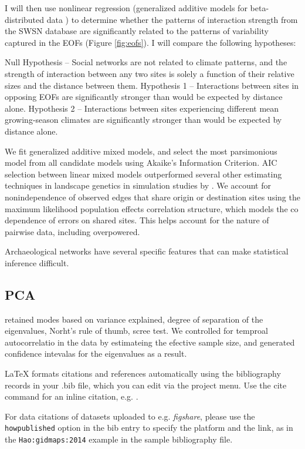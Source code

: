 \documentclass[fleqn,10pt]{wlscirep}
\begin{document}
I will then use nonlinear regression (generalized additive models for beta-distributed data \cite{Wood2006a}) to determine whether the patterns of interaction strength from the SWSN database are significantly related to the patterns of variability captured in the EOFs (Figure \ref{fig:eofs}). I will compare the following hypotheses:

Null Hypothesis -- Social networks are not related to climate patterns, and the strength of interaction between any two sites is solely a function of their relative sizes and the distance between them.
Hypothesis 1 -- Interactions between sites in opposing EOFs are significantly stronger than would be expected by distance alone.
Hypothesis 2 -- Interactions between sites experiencing different mean growing-season climates are significantly stronger than would be expected by distance alone.

We fit generalized additive mixed models, and select the most parsimonious model from all candidate models using Akaike's Information Criterion. AIC selection between linear mixed models outperformed several other estimating techniques in landscape genetics in simulation studies by \cite{Shirk et al 2018}. We account for nonindependence of observed edges that share origin or destination sites using the maximum likelihood population effects correlation structure, which models the co dependence of errors on shared sites. This helps account for the nature of pairwise data, including overpowered.

Archaeological networks have several specific features that can make statistical inference difficult.

\subsection*{PCA}
retained modes based on variance explained, degree of separation of the eigenvalues, Norht's rule of thumb, scree test. We controlled for temproal autocorrelatio in the data by estimateing the efective sample size, and generated confidence intevalas for the eigenvalues as a result.




\noindent LaTeX formats citations and references automatically using the bibliography records in your .bib file, which you can edit via the project menu. Use the cite command for an inline citation, e.g.  \cite{Hao:gidmaps:2014}.

For data citations of datasets uploaded to e.g. \emph{figshare}, please use the \verb|howpublished| option in the bib entry to specify the platform and the link, as in the \verb|Hao:gidmaps:2014| example in the sample bibliography file.
\end{document}
